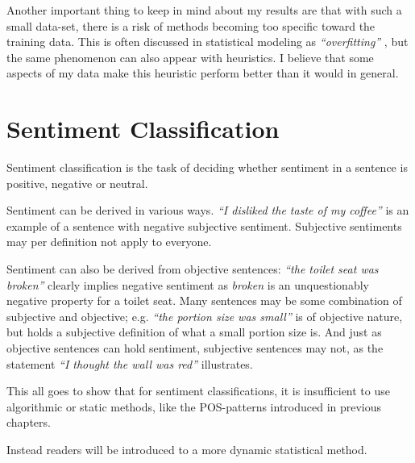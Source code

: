 \documentclass[a4paper,11pt]{kth-mag}
\begin{document}
Another important thing to keep in mind about my results are that with such a small data-set,
there is a risk of methods becoming too specific toward the training data.
This is often discussed in statistical modeling as \emph{``overfitting'' },
but the same phenomenon can also appear with heuristics.
I believe that some aspects of my data make this heuristic perform better than it would in general.








\chapter{Sentiment Classification}
Sentiment classification is the task of deciding whether sentiment in a sentence
is positive, negative or neutral\cite{nlp_book}.


Sentiment can be derived in various ways. \emph{``I disliked the taste of my coffee''}
is an example of a sentence with negative subjective sentiment.
Subjective sentiments may per definition not apply to everyone.

Sentiment can also be derived from objective sentences:
\emph{``the toilet seat was broken''} clearly implies negative sentiment
as \emph{broken} is an unquestionably negative property for a toilet seat.
Many sentences may be some combination of subjective and objective;
e.g. \emph{``the portion size was small''} is of objective nature,
but holds a subjective definition of what a small portion size is.
And just as objective sentences can hold sentiment, subjective sentences may not, as
the statement \emph{``I thought the wall was red''} illustrates.

This all goes to show that for sentiment classifications, it is insufficient
to use algorithmic or static methods, like the POS-patterns introduced in previous
chapters.

Instead readers will be introduced to a more dynamic statistical method.
\end{document}
